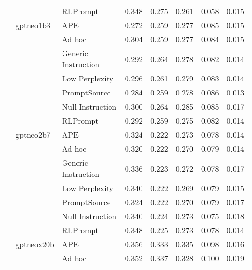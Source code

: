\begin{supertabular}{lllrrrrr}
              &        & RLPrompt &            0.348 &           0.275 &          0.261 &        0.058 &    0.015 \\
              & gptneo1b3 & APE &            0.272 &           0.259 &          0.277 &        0.085 &    0.015 \\
              &        & Ad hoc &            0.304 &           0.259 &          0.277 &        0.084 &    0.015 \\
              &        & Generic Instruction &            0.292 &           0.264 &          0.278 &        0.082 &    0.014 \\
              &        & Low Perplexity &            0.296 &           0.261 &          0.279 &        0.083 &    0.014 \\
              &        & PromptSource &            0.284 &           0.259 &          0.278 &        0.086 &    0.013 \\
              &        & Null Instruction &            0.300 &           0.264 &          0.285 &        0.085 &    0.017 \\
              &        & RLPrompt &            0.292 &           0.259 &          0.275 &        0.082 &    0.014 \\
              & gptneo2b7 & APE &            0.324 &           0.222 &          0.273 &        0.078 &    0.014 \\
              &        & Ad hoc &            0.320 &           0.222 &          0.270 &        0.079 &    0.014 \\
              &        & Generic Instruction &            0.336 &           0.223 &          0.272 &        0.078 &    0.017 \\
              &        & Low Perplexity &            0.340 &           0.222 &          0.269 &        0.079 &    0.015 \\
              &        & PromptSource &            0.324 &           0.222 &          0.270 &        0.079 &    0.017 \\
              &        & Null Instruction &            0.340 &           0.224 &          0.273 &        0.075 &    0.018 \\
              &        & RLPrompt &            0.348 &           0.225 &          0.273 &        0.078 &    0.014 \\
              & gptneox20b & APE &            0.356 &           0.333 &          0.335 &        0.098 &    0.016 \\
              &        & Ad hoc &            0.352 &           0.337 &          0.328 &        0.100 &    0.019 \\

\end{supertabular}
